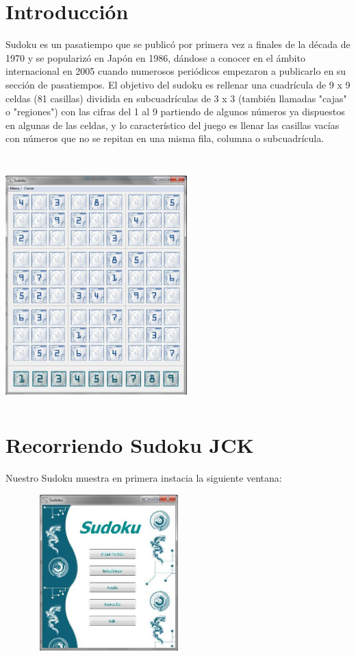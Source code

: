 \documentclass[12pt]{article}
\begin{document}
\section{Introducción}

Sudoku es un pasatiempo que se publicó por primera vez a finales de la década de 1970 y se popularizó en Japón en 1986, dándose a conocer en el ámbito internacional en 2005 cuando numerosos periódicos empezaron a publicarlo en su sección de pasatiempos. El objetivo del sudoku es rellenar una cuadrícula de 9 x 9 celdas (81 casillas) dividida en subcuadrículas de 3 x 3 (también llamadas "cajas" o "regiones") con las cifras del 1 al 9 partiendo de algunos números ya dispuestos en algunas de las celdas, y lo característico del juego es llenar las casillas vacías con números que no se  repitan en una misma fila, columna o subcuadrícula. \\\\
\begin{center}
		\includegraphics[height=9cm,width=7cm]{dificil.jpg}
	\end{center}
	
	




\section{Recorriendo Sudoku JCK}

	Nuestro Sudoku muestra en primera instacia la siguiente ventana:

	\begin{center}
		\includegraphics[height=6cm,width=8cm]{principal.jpg}
	\end{center}
\end{document}
